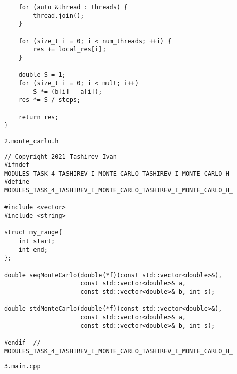 \documentclass{report}
\begin{document}
\begin{lstlisting}
    for (auto &thread : threads) {
        thread.join();
    }

    for (size_t i = 0; i < num_threads; ++i) {
        res += local_res[i];
    }

    double S = 1;
    for (size_t i = 0; i < mult; i++)
        S *= (b[i] - a[i]);
    res *= S / steps;

    return res;
}
\end{lstlisting}
\par \verb|2.monte_carlo.h|
\begin{lstlisting}
// Copyright 2021 Tashirev Ivan
#ifndef MODULES_TASK_4_TASHIREV_I_MONTE_CARLO_TASHIREV_I_MONTE_CARLO_H_
#define MODULES_TASK_4_TASHIREV_I_MONTE_CARLO_TASHIREV_I_MONTE_CARLO_H_

#include <vector>
#include <string>

struct my_range{
    int start;
    int end;
};

double seqMonteCarlo(double(*f)(const std::vector<double>&),
                     const std::vector<double>& a,
                     const std::vector<double>& b, int s);

double stdMonteCarlo(double(*f)(const std::vector<double>&),
                     const std::vector<double>& a,
                     const std::vector<double>& b, int s);

#endif  // MODULES_TASK_4_TASHIREV_I_MONTE_CARLO_TASHIREV_I_MONTE_CARLO_H_
\end{lstlisting}
\par \verb|3.main.cpp|
\end{document}
